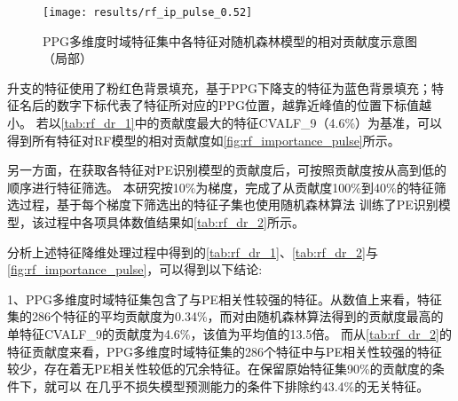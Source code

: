 \begin{figure}[htbp]
    \centering
    \texttt{[image: results/rf\_ip\_pulse\_0.52]}
    \caption[PPG多维度时域特征集中各特征对随机森林模型的相对贡献度示意图（局部）]{\label{fig:rf_importance_pulse}PPG多维度时域特征集中各特征对随机森林模型的相对贡献度示意图（局部）}
\end{figure}

\noindent
升支的特征使用了粉红色背景填充，基于PPG下降支的特征为蓝色背景填充；特征名后的数字下标代表了特征所对应的PPG位置，越靠近峰值的位置下标值越小。
若以\autoref{tab:rf_dr_1}中的贡献度最大的特征CVALF\_9（4.6\%）为基准，可以得到所有特征对RF模型的相对贡献度如\autoref{fig:rf_importance_pulse}所示。

另一方面，在获取各特征对PE识别模型的贡献度后，可按照贡献度按从高到低的顺序进行特征筛选。
本研究按10\%为梯度，完成了从贡献度100\%到40\%的特征筛选过程，基于每个梯度下筛选出的特征子集也使用随机森林算法
训练了PE识别模型，该过程中各项具体数值结果如\autoref{tab:rf_dr_2}所示。

分析上述特征降维处理过程中得到的\autoref{tab:rf_dr_1}、\autoref{tab:rf_dr_2}与\autoref{fig:rf_importance_pulse}，可以得到以下结论:

1、PPG多维度时域特征集包含了与PE相关性较强的特征。从数值上来看，特征集的286个特征的平均贡献度为0.34\%，而对由随机森林算法得到的贡献度最高的单特征CVALF\_9的贡献度为4.6\%，该值为平均值的13.5倍。
而从\autoref{tab:rf_dr_2}的特征贡献度来看，PPG多维度时域特征集的286个特征中与PE相关性较强的特征较少，存在着无PE相关性较低的冗余特征。在保留原始特征集90\%的贡献度的条件下，就可以
在几乎不损失模型预测能力的条件下排除约43.4\%的无关特征。

